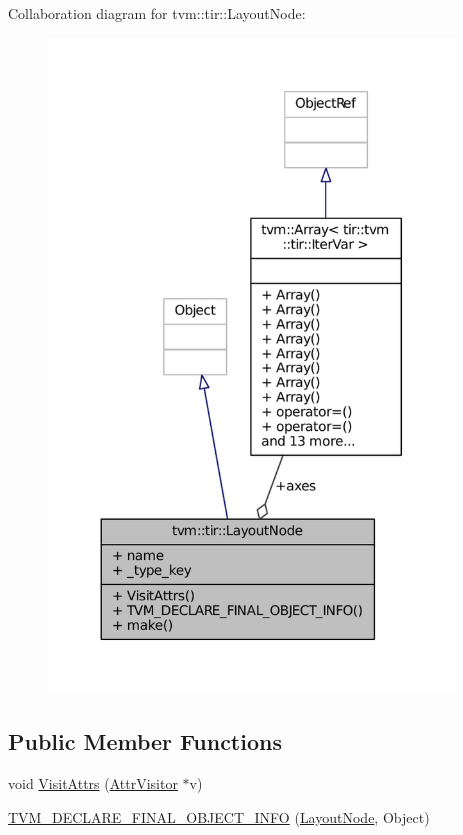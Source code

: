 Collaboration diagram for tvm\+:\+:tir\+:\+:Layout\+Node\+:
\nopagebreak
\begin{figure}[H]
\begin{center}
\leavevmode
\includegraphics[width=305pt]{classtvm_1_1tir_1_1LayoutNode__coll__graph}
\end{center}
\end{figure}
\subsection*{Public Member Functions}
\begin{DoxyCompactItemize}
\item 
void \hyperlink{classtvm_1_1tir_1_1LayoutNode_a2977b7ca9f44e09896696bcdb4b61953}{Visit\+Attrs} (\hyperlink{classtvm_1_1AttrVisitor}{Attr\+Visitor} $\ast$v)
\item 
\hyperlink{classtvm_1_1tir_1_1LayoutNode_a93ee927641803d612f7f93cc5aa3b6d0}{T\+V\+M\+\_\+\+D\+E\+C\+L\+A\+R\+E\+\_\+\+F\+I\+N\+A\+L\+\_\+\+O\+B\+J\+E\+C\+T\+\_\+\+I\+N\+FO} (\hyperlink{classtvm_1_1tir_1_1LayoutNode}{Layout\+Node}, Object)
\end{DoxyCompactItemize}
